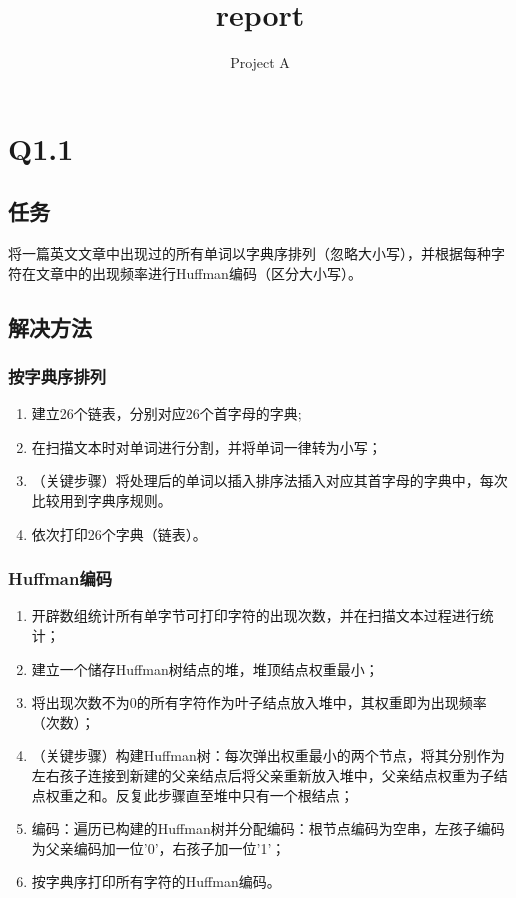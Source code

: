 \documentclass{homework}
\title{report}
\subtitle{Project A}
\begin{document}
\maketitle
\section{Q1.1}
\subsection{任务}
将一篇英文文章中出现过的所有单词以字典序排列（忽略大小写），并根据每种字符在文章中的出现频率进行Huffman编码（区分大小写）。
\subsection{解决方法}
\subsubsection{按字典序排列}
\begin{enumerate}
    \item 建立26个链表，分别对应26个首字母的字典;
    \item 在扫描文本时对单词进行分割，并将单词一律转为小写；
    \item （关键步骤）将处理后的单词以插入排序法插入对应其首字母的字典中，每次比较用到字典序规则。
    \item 依次打印26个字典（链表）。
\end{enumerate}
\subsubsection{Huffman编码}
\begin{enumerate}
    \item 开辟数组统计所有单字节可打印字符的出现次数，并在扫描文本过程进行统计；
    \item 建立一个储存Huffman树结点的堆，堆顶结点权重最小；
    \item 将出现次数不为0的所有字符作为叶子结点放入堆中，其权重即为出现频率（次数）；
    \item （关键步骤）构建Huffman树：每次弹出权重最小的两个节点，将其分别作为左右孩子连接到新建的父亲结点后将父亲重新放入堆中，父亲结点权重为子结点权重之和。反复此步骤直至堆中只有一个根结点；
    \item 编码：遍历已构建的Huffman树并分配编码：根节点编码为空串，左孩子编码为父亲编码加一位'0'，右孩子加一位'1'；
    \item 按字典序打印所有字符的Huffman编码。
\end{enumerate}
\end{document}

